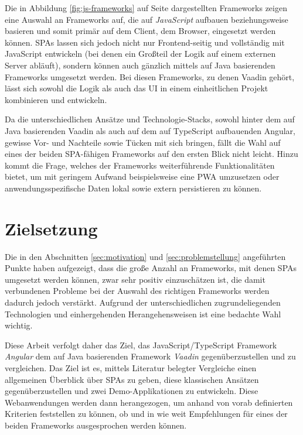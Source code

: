 \documentclass[a4paper,12pt,twoside]{scrreprt}
\begin{document}
Die in Abbildung \ref{fig:js-frameworks} auf Seite \pageref{fig:js-frameworks} dargestellten Frameworks zeigen eine Auswahl an Frameworks auf, die auf \textit{JavaScript} aufbauen beziehungsweise basieren und somit primär auf dem Client, dem Browser, eingesetzt werden können. \acp{SPA} lassen sich jedoch nicht nur Frontend-seitig und vollständig mit JavaScript entwickeln (bei denen ein Großteil der Logik auf einem externen Server abläuft), sondern können auch gänzlich mittels auf Java basierenden Frameworks umgesetzt werden. Bei diesen Frameworks, zu denen Vaadin gehört, lässt sich sowohl die Logik als auch das \ac{UI} in einem einheitlichen Projekt kombinieren und entwickeln.

Da die unterschiedlichen Ansätze und Technologie-Stacks, sowohl hinter dem auf Java basierenden Vaadin als auch auf dem auf TypeScript aufbauenden Angular, gewisse Vor- und Nachteile sowie Tücken mit sich bringen, fällt die Wahl auf eines der beiden \ac{SPA}-fähigen Frameworks auf den ersten Blick nicht leicht. Hinzu kommt die Frage, welches der Frameworks weiterführende Funktionalitäten bietet, um mit geringem Aufwand beispielsweise eine \ac{PWA} umzusetzen oder anwendungsspezifische Daten lokal sowie extern persistieren zu können.

\section{Zielsetzung}
\label{sec:zielsetzung}
Die in den Abschnitten \ref{sec:motivation} und \ref{sec:problemstellung} angeführten Punkte haben aufgezeigt, dass die große Anzahl an Frameworks, mit denen \acp{SPA} umgesetzt werden können, zwar sehr positiv einzuschätzen ist, die damit verbundenen Probleme bei der Auswahl des richtigen Frameworks werden dadurch jedoch verstärkt. Aufgrund der unterschiedlichen zugrundeliegenden Technologien und einhergehenden Herangehensweisen ist eine bedachte Wahl wichtig.

\medskip

Diese Arbeit verfolgt daher das Ziel, das JavaScript/TypeScript Framework \textit{Angular} dem auf Java basierenden Framework \textit{Vaadin} gegenüberzustellen und zu vergleichen. Das Ziel ist es, mittels Literatur belegter Vergleiche einen allgemeinen Überblick über \acp{SPA} zu geben, diese klassischen Ansätzen gegenüberzustellen und zwei Demo-Applikationen zu entwickeln. Diese Webanwendungen werden dann herangezogen, um anhand von vorab definierten Kriterien feststellen zu können, ob und in wie weit Empfehlungen für eines der beiden Frameworks ausgesprochen werden können.
\end{document}
